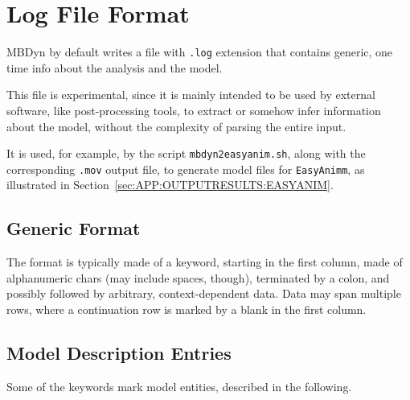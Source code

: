 %
%
%
%
%
% 
%
%

\chapter{Log File Format}
\label{sec:APP:LOGFILE}

MBDyn by default writes a file with \texttt{.log} extension that contains
generic, one time info about the analysis and the model.

This file is experimental, since it is mainly intended to be used
by external software, like post-processing tools, to extract 
or somehow infer information about the model, without the complexity
of parsing the entire input.

It is used, for example, by the script \texttt{mbdyn2easyanim.sh}, along
with the corresponding \texttt{.mov} output file, to generate model files
for \texttt{EasyAnimm}, as illustrated
in Section~\ref{sec:APP:OUTPUTRESULTS:EASYANIM}.

\section{Generic Format}
The format is typically made of a keyword, starting in the first column,
made of alphanumeric chars (may include spaces, though), 
terminated by a colon, and possibly followed by arbitrary, 
context-dependent data.
Data may span multiple rows, where a continuation row is marked 
by a blank in the first column.

\section{Model Description Entries}
Some of the keywords mark model entities, described in the following.

